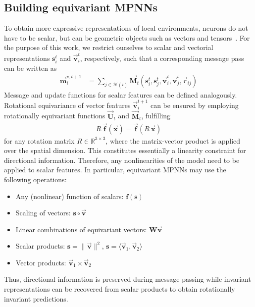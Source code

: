 \documentclass[reprint,
amsmath,amssymb,
 aip,jcp
]{revtex4-2}
\newcommand{\new}[1]{#1}
\begin{document}
\subsection{Building equivariant MPNNs}
To obtain more expressive representations of local environments, neurons do not have to be scalar, but can be geometric objects such as vectors and tensors~\cite{hinton2011transforming,cohen2016steerable,thomas2018tensor,anderson2019cormorant}.
For the purpose of this work, we restrict ourselves to scalar and vectorial representations $\mathbf{s}_i^{t}$ and $\vec{\mathbf{v}}_i^{t}$, respectively, such that a corresponding message pass can be written as
\begin{align}
\vec{\mathbf{m}}_i^{v,t+1} &= \sum_{j \in \mathcal{N}(i)} \vec{\mathbf{M}}_t(\mathbf{s}_i^{t}, \mathbf{s}_j^{t}, \vec{\mathbf{v}}_i^{t}, \vec{\mathbf{v}}_j^{t}, \vec{r}_{ij})
\label{eq:mpv}
\end{align}
Message and update functions for scalar features can be defined analogously.
\new{Rotational equivariance of vector features $\vec{\mathbf{v}}_i^{t+1}$ can be ensured by employing rotationally equivariant functions $\vec{\mathbf{U}}_t$ and $\vec{\mathbf{M}}_t$, fulfilling}
\begin{align}
    R \, \vec{\mathbf{f}}(\vec{\mathbf{x}}) = \vec{\mathbf{f}}(R \,\vec{\mathbf{x}})
\end{align}
\new{for any rotation matrix $R \in \mathbb{R}^{3 \times 3}$, where the matrix-vector product is applied over the spatial dimension.}
This constitutes essentially a linearity constraint for directional information.
Therefore, any nonlinearities of the model need to be applied to scalar features.
In particular, equivariant MPNNs may use the following operations:
\begin{itemize}
    \item Any (nonlinear) function of scalars: $\mathbf{f}(\mathbf{s})$
    \item Scaling of vectors: $\mathbf{s} \circ \vec{\mathbf{v}}$
    \item Linear combinations of equivariant vectors: $\mathbf{W} \vec{\mathbf{v}}$
    \item Scalar products: $\mathbf{s} = \| \vec{\mathbf{v}} \|^2$, $\mathbf{s} = \langle \vec{\mathbf{v}}_1, \vec{\mathbf{v}}_2 \rangle$
    \item Vector products: $\vec{\mathbf{v}}_1 \times \vec{\mathbf{v}}_2$
\end{itemize}
Thus, directional information is preserved during message passing while invariant representations can be recovered from scalar products to obtain rotationally invariant predictions.
\end{document}
